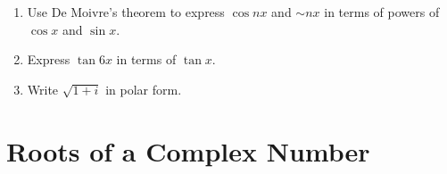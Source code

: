 \documentclass[11pt, oneside]{book}
\begin{document}
\begin{enumerate}

	\item Use De Moivre's theorem to express $\cos nx$ and $\sim nx$ in terms of powers of $\cos x$ and $\sin x$.

	\item Express $\tan 6x$ in terms of $\tan x$.

	\item Write $\sqrt{1 + i}$ in polar form.
\end{enumerate}


\section{Roots of a Complex Number} %
\label{sec:roots_of_a_complex_number}
\end{document}
